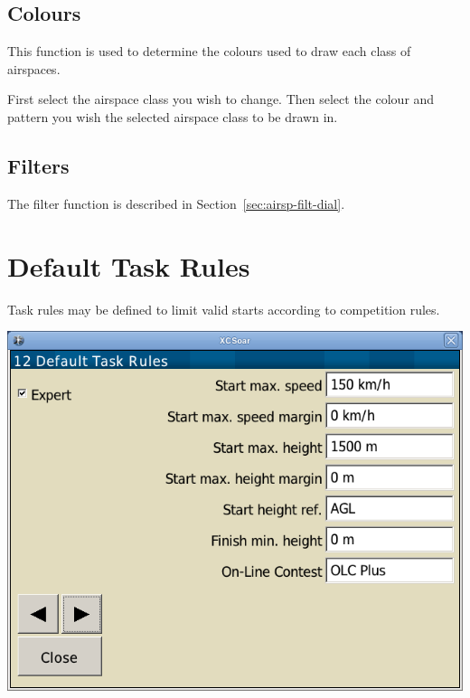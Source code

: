 \subsection*{Colours}
This function is used to determine the colours used to draw each class of
airspaces.

First select the airspace class you wish to change. Then select the colour and 
pattern you wish the selected airspace class to be drawn in.

\subsection*{Filters}
The filter function is described in Section~\ref{sec:airsp-filt-dial}.


\clearpage
\section{Default Task Rules}
Task rules may be defined to limit valid starts according to competition
rules. \label{conf:taskrules}

\begin{center}
\includegraphics[angle=0,width=0.8\linewidth,keepaspectratio='true']{figures/config-rules.png}
\end{center}

